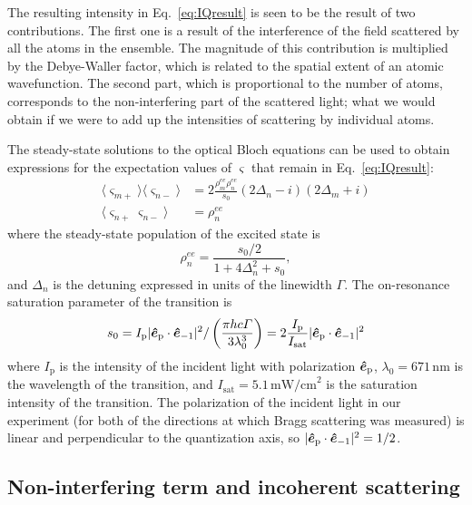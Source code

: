 The resulting intensity in Eq.~\ref{eq:IQresult} is seen to be the result of
two contributions.  The first one is a result of the interference of the field
scattered by all the atoms in the ensemble.  The magnitude of this contribution
is multiplied by the Debye-Waller factor,  which is related to the spatial
extent of an atomic wavefunction.   	The second part, which is proportional
to the number of atoms, corresponds to the non-interfering part of the
scattered light;  what we would obtain if we were to add up the intensities of
scattering by individual atoms. 

The steady-state solutions to the optical Bloch equations can be used to obtain
expressions for the expectation values of $\varsigma$ that remain in
Eq.~\ref{eq:IQresult}:
\begin{align}
       \langle \varsigma_{m+}\rangle \langle \varsigma_{n-} \rangle & =
    2 \frac{ \rho_{m}^{ee} \rho_{n}^{ee} }{ s_{0} }
     ( 2\Delta_{n} -i )( 2\Delta_{m} + i ) \\
       \langle \varsigma_{n+}  \varsigma_{n-} \rangle &  = \rho_{n}^{ee}
\end{align}
where the steady-state population of the excited state is 
\begin{equation}
   \rho_{n}^{ee}  = \frac{ s_{0}/2}{ 1+ 4\Delta_{n}^{2} + s_{0} } ,
\end{equation} 
and $\Delta_{n}$ is the detuning expressed in units of the linewidth
$\Gamma$.  The on-resonance saturation parameter of the transition is 
\begin{equation}
s_{0}
= I_{\text{p}}| \bm{\hat{e}}_{\text{p}} \cdot \bm{\hat{e}}_{-1} |^{2}  /
\left( \frac{\pi h c \Gamma}{3\lambda_{0}^{3}} \right)  
  = 2 \frac{I_{\text{p}}}{I_{\mathrm{sat}}} 
    | \bm{\hat{e}}_{\text{p}} \cdot \bm{\hat{e}}_{-1} |^{2} 
\end{equation}
 where $I_{\text{p}}$ is the intensity of the incident light with polarization
$\bm{\hat{e}}_{\text{p}}$,  $\lambda_{0}=671\,\mathrm{nm}$ is the wavelength of
the transition, and $I_{\mathrm{sat}}=5.1\,\mathrm{mW/cm}^{2}$ is the
saturation intensity of the transition.  The polarization of the incident light
in our experiment (for both of the directions at which Bragg scattering was
measured) is linear and perpendicular to the quantization axis, so $|
\bm{\hat{e}}_{\text{p}} \cdot \bm{\hat{e}}_{-1} |^{2} =  1/2$.

\subsection{Non-interfering term and incoherent scattering}

